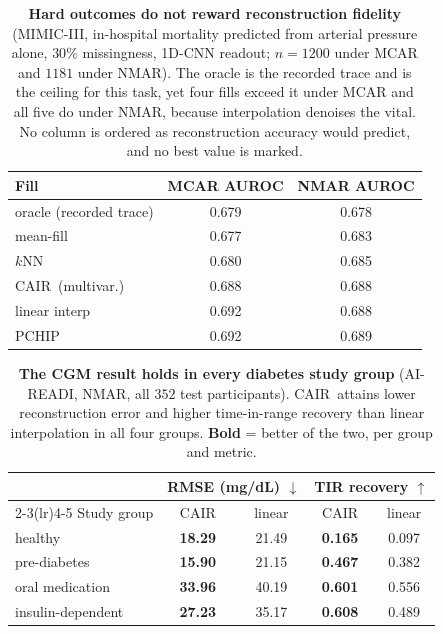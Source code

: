 \begin{table}[t]
  \centering
  {\small
  \setlength{\tabcolsep}{6pt}
  \begin{tabular}{lcc}
    \toprule
    Fill & MCAR AUROC & NMAR AUROC \\
    \midrule
    oracle (recorded trace) & 0.679 & 0.678 \\
    \midrule
    mean-fill      & 0.677 & 0.683 \\
    $k$NN          & 0.680 & 0.685 \\
    CAIR\ (multivar.) & 0.688 & 0.688 \\
    linear interp  & 0.692 & 0.688 \\
    PCHIP          & 0.692 & 0.689 \\
    \bottomrule
  \end{tabular}}
  \caption{\textbf{Hard outcomes do not reward reconstruction fidelity}
  (MIMIC-III, in-hospital mortality predicted from arterial pressure alone,
  $30\%$ missingness, 1D-CNN readout; $n=1200$ under MCAR and $1181$ under
  NMAR). The oracle is the recorded trace and is the ceiling for this task, yet
  four fills exceed it under MCAR and all five do under NMAR, because
  interpolation denoises the vital. No column is ordered as reconstruction
  accuracy would predict, and no best value is marked.}
  \label{tab:singlevital}
\end{table}

\begin{table}[t]
  \centering
  {\small
  \setlength{\tabcolsep}{4pt}
  \begin{tabular}{lcccc}
    \toprule
    & \multicolumn{2}{c}{RMSE (mg/dL) $\downarrow$} & \multicolumn{2}{c}{TIR recovery $\uparrow$} \\
    \cmidrule(lr){2-3}\cmidrule(lr){4-5}
    Study group & CAIR & linear & CAIR & linear \\
    \midrule
    healthy            & \textbf{18.29} & 21.49 & \textbf{0.165} & 0.097 \\
    pre-diabetes       & \textbf{15.90} & 21.15 & \textbf{0.467} & 0.382 \\
    oral medication    & \textbf{33.96} & 40.19 & \textbf{0.601} & 0.556 \\
    insulin-dependent  & \textbf{27.23} & 35.17 & \textbf{0.608} & 0.489 \\
    \bottomrule
  \end{tabular}}
  \caption{\textbf{The CGM result holds in every diabetes study group}
  (AI-READI, NMAR, all $352$ test participants). CAIR\ attains lower
  reconstruction error and higher time-in-range recovery than linear
  interpolation in all four groups. \textbf{Bold} = better of the two, per group
  and metric.}
  \label{tab:cohort}
\end{table}